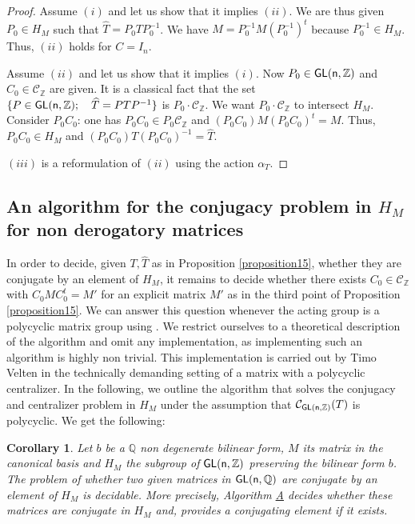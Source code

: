 \documentclass[a4paper,11pt]{article}
\newtheorem{corollary}{Corollary}[section]
\theoremstyle{definition}
\newcommand{\Z}{\mathbb Z}
\newcommand{\Q}{\mathbb Q}
\newcommand{\C}{\mathcal C}
\newcommand{\myref}[1]{\hyperref[#1]{#1}}
\def \GL{\sf{GL}}
\begin{document}
\begin{proof}
Assume $(i)$ and let us show that it implies $(ii)$. We are thus given $P_0 \in H_M$ such that  $\widehat{T}=P_0TP_{0}^{-1}$. We have $M=P_{0}^{-1}M(P_{0}^{-1})^t$ because $P_{0}^{-1} \in H_M$. Thus, $(ii)$ holds for $C=I_n$.


Assume $(ii)$ and let us show that it implies $(i)$. Now $P_0 \in \GL(n,\Z)$ and $C_0 \in \C_{\Z}$ are given. It is a classical fact that the set $\{ P\in \GL(n,\Z) ;\quad \text{$\widehat{T}=PTP^{-1}$} \}$ is $P_0 \cdot \C_{\Z}$. We want $P_0 \cdot \C_{\Z}$ to intersect $H_M$. Consider $P_0C_0$: one has $P_0C_0 \in P_0\C_{\Z}$ and $(P_0C_0)M(P_0C_0)^t=M$. Thus, $P_0C_0 \in H_M$ and $(P_0C_0)T(P_0C_0)^{-1}=\widehat{T}$.

$(iii)$ is a reformulation of $(ii)$ using the action $\alpha_T$. 


\end{proof}



\subsection[An algorithm for the conjugacy problem in HM for non derogatory matrices]{An algorithm for the conjugacy problem in $H_M$ for non derogatory matrices}\label{section3.2}
In order to decide, given $T, \widehat{T}$ as in Proposition \ref{proposition15},  whether
they are conjugate by an element of $H_M$, it remains to decide whether
there exists
$C_0 \in \C_{\Z}$ with $C_0MC_0^t = M'$  for an explicit matrix $M'$ as in the
third point of Proposition \ref{proposition15}. We can answer this question whenever the acting group is a polycyclic matrix group using \cite{eick2003orbit}. We restrict ourselves to a theoretical description of the algorithm and omit any implementation, as implementing such an algorithm is highly non trivial. This implementation is carried out by Timo Velten \cite{velten2026polycyclic} in the technically demanding setting of a matrix with a polycyclic centralizer. In the following, we outline the algorithm that solves the conjugacy and centralizer problem in $H_M$ under the assumption that $\C_{\GL(n,\Z)}(T)$ is polycyclic.
We get the following: 

\begin{corollary}
  Let $b$ be a $\Q$ non degenerate bilinear form, $M$ its matrix in the canonical basis and $H_M$ the subgroup of $\GL(n,\Z)$ preserving the bilinear form $b$.
    The problem of whether two given matrices in $\GL(n,\Q)$ are conjugate by an element of $H_M$ is decidable. More precisely, Algorithm \myref{A} decides whether these matrices are conjugate in $H_M$ and, provides a conjugating element if it exists.
\end{corollary}
\end{document}
